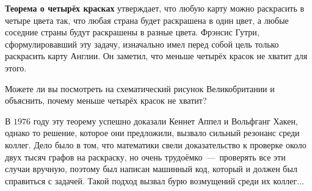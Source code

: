 \begin{paracol}{2}
	\textbf{Теорема о четырёх красках} утверждает, что любую карту можно раскрасить в четыре цвета так, что любая страна будет раскрашена в один цвет, 
	а любые соседние страны будут раскрашены в разные цвета. Фрэнсис Гутри, сформулировавший эту задачу, изначально имел перед собой цель 
	только раскрасить карту Англии. Он заметил, что меньше четырёх красок не хватит для этого. 

\begin{testquestion}	
	Можете ли вы посмотреть на схематический рисунок Великобритании и объяснить, почему меньше четырёх красок не хватит?
\end{testquestion}
	
	В $1976$ году эту теорему успешно доказали Кеннет Аппел и Вольфганг Хакен, однако то решение, которое они предложили, 
	вызвало сильный резонанс среди коллег. Дело было в том, что математики свели доказательство к проверке около двух тысяч 
	графов на раскраску, но очень трудоёмко~---~проверять все эти случаи вручную, поэтому был написан машинный код, который 
	и должен был справиться с задачей. Такой подход вызвал бурю возмущений среди их коллег...
	
\switchcolumn


\end{paracol}
